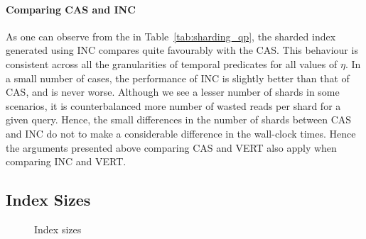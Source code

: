  
\paragraph{Comparing CAS and INC}  As one can observe from the in Table~\ref{tab:sharding_qp}, the sharded index generated using INC compares quite favourably with the CAS. This behaviour is consistent across all the granularities of temporal predicates for all values of $\eta$. In a small number of cases, the performance of INC is slightly better than that of CAS, and is never worse. Although we see a lesser number of shards in some scenarios, it is counterbalanced more number of wasted reads per shard for a given query. Hence, the small differences in the number of shards between CAS and INC do not to make a considerable difference in the wall-clock times. Hence the arguments presented above comparing CAS and VERT also apply when comparing INC and VERT.


\subsection{Index Sizes}


\begin{figure}[tp]
  	\centering	
		\quad
   	\caption{Index sizes}
   	\label{fig:index_sizes}
\end{figure}


